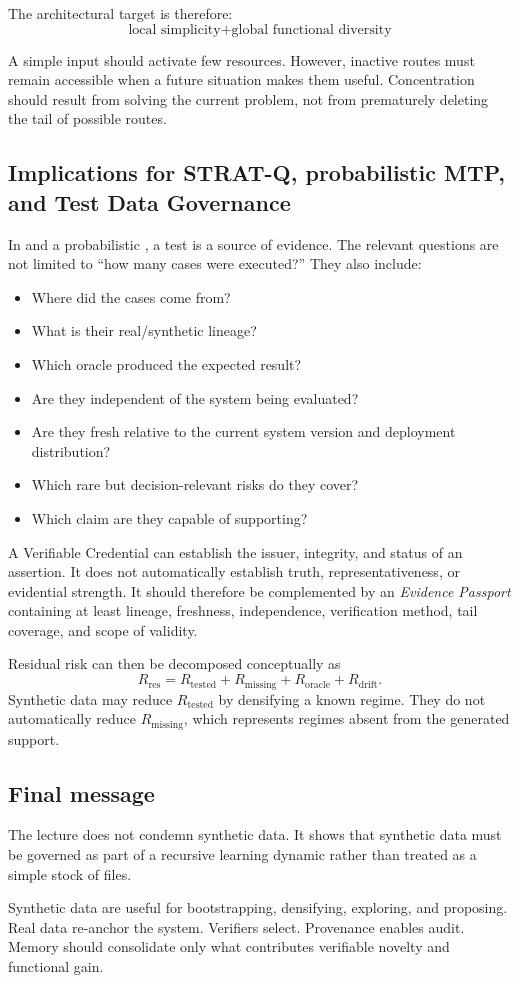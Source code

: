 The architectural target is therefore:
\[
\boxed{\text{local simplicity} + \text{global functional diversity}}
\]

A simple input should activate few resources. However, inactive routes must remain accessible when a future situation makes them useful. Concentration should result from solving the current problem, not from prematurely deleting the tail of possible routes.

\subsection{Implications for STRAT-Q, probabilistic MTP, and Test Data Governance}

In \STRATQ{} and a probabilistic \MTP{}, a test is a source of evidence. The relevant questions are not limited to ``how many cases were executed?'' They also include:

\begin{itemize}[leftmargin=*]
  \item Where did the cases come from?
  \item What is their real/synthetic lineage?
  \item Which oracle produced the expected result?
  \item Are they independent of the system being evaluated?
  \item Are they fresh relative to the current system version and deployment distribution?
  \item Which rare but decision-relevant risks do they cover?
  \item Which claim are they capable of supporting?
\end{itemize}

A Verifiable Credential can establish the issuer, integrity, and status of an assertion. It does not automatically establish truth, representativeness, or evidential strength. It should therefore be complemented by an \emph{Evidence Passport} containing at least lineage, freshness, independence, verification method, tail coverage, and scope of validity.

Residual risk can then be decomposed conceptually as
\[
R_{\mathrm{res}} = R_{\mathrm{tested}} + R_{\mathrm{missing}} + R_{\mathrm{oracle}} + R_{\mathrm{drift}}.
\]
Synthetic data may reduce $R_{\mathrm{tested}}$ by densifying a known regime. They do not automatically reduce $R_{\mathrm{missing}}$, which represents regimes absent from the generated support.

\subsection{Final message}

The lecture does not condemn synthetic data. It shows that synthetic data must be governed as part of a recursive learning dynamic rather than treated as a simple stock of files.

\begin{keyidea}
Synthetic data are useful for bootstrapping, densifying, exploring, and proposing. Real data re-anchor the system. Verifiers select. Provenance enables audit. Memory should consolidate only what contributes verifiable novelty and functional gain.
\end{keyidea}
